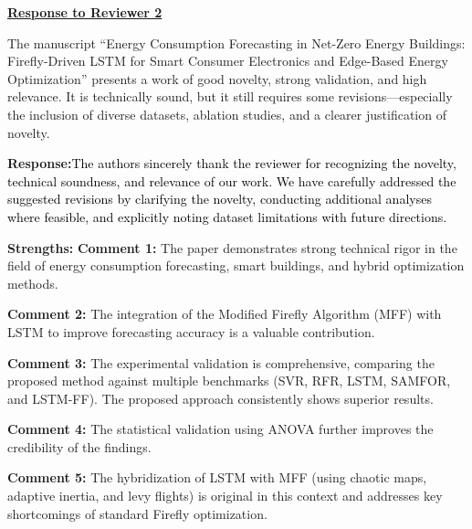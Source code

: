 \documentclass[12pt]{article}
\begin{document}
\begin{center}
	\fontsize{14}{1}\textbf{\underline{Response to Reviewer 2}}\\
\end{center}



The manuscript “Energy Consumption Forecasting in Net-Zero Energy Buildings: Firefly-Driven LSTM for Smart Consumer Electronics and Edge-Based Energy Optimization” presents a work of good novelty, strong validation, and high relevance. It is technically sound, but it still requires some revisions—especially the inclusion of diverse datasets, ablation studies, and a clearer justification of novelty.
\vspace{0.15cm}

\hspace{-1.5em}\textbf{Response:}\noindent\textcolor{black}{The authors sincerely thank the reviewer for recognizing the novelty, technical soundness, and relevance of our work. We have carefully addressed the suggested revisions by clarifying the novelty, conducting additional analyses where feasible, and explicitly noting dataset limitations with future directions.}\newline
\newline

\noindent\textbf{Strengths:} \newline
\noindent\textbf{Comment 1:} The paper demonstrates strong technical rigor in the field of energy consumption forecasting, smart buildings, and hybrid optimization methods.


\noindent\textbf{Comment 2:} The integration of the Modified Firefly Algorithm (MFF) with LSTM to improve forecasting accuracy is a valuable contribution.


\noindent\textbf{Comment 3:} The experimental validation is comprehensive, comparing the proposed method against multiple benchmarks (SVR, RFR, LSTM, SAMFOR, and LSTM-FF). The proposed approach consistently shows superior results.



\noindent\textbf{Comment 4:} The statistical validation using ANOVA further improves the credibility of the findings.



\noindent\textbf{Comment 5:} The hybridization of LSTM with MFF (using chaotic maps, adaptive inertia, and levy flights) is original in this context and addresses key shortcomings of standard Firefly optimization.
\end{document}
